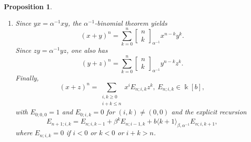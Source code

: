 \documentclass{amsart}
\newtheorem{proposition}[theorem]{Proposition}
\theoremstyle{definition}
\theoremstyle{remark}
\numberwithin{equation}{section}
\begin{document}
\begin{proposition}
\begin{enumerate}
\item[\rm (5)] Since $yx=\alpha^{-1}xy$, the $\alpha^{-1}$-binomial theorem yields
\[
(x+y)^n=\sum_{k=0}^{n}\begin{bmatrix} n\\ k\end{bmatrix}_{\alpha^{-1}}x^{n-k}y^{k}.
\]
Since $zy = \alpha^{-1}yz$, one also has
\[
(y+z)^n=\sum_{k=0}^{n}\begin{bmatrix} n\\ k\end{bmatrix}_{\alpha^{-1}}y^{n-k}z^{k}.
\]
Finally, 
\begin{equation}\label{Edefcase3ii}
(x+z)^n=\sum_{\substack{i,k\ge 0\\ i+k\le n}} x^{i}E_{n;i,k}z^{k},
\ E_{n;i,k}\in\Bbbk[b],
\end{equation}
with $E_{0;0,0}=1$ and $E_{0;i,k}=0$ for $(i,k)\neq(0,0)$ and the explicit recursion
\begin{equation}\label{Ereccase3ii}
E_{n+1;i,k}=E_{n;i,k-1}+\beta^{k}E_{n;i-1,k}+b\langle k+1\rangle_{\beta,\alpha^{-1}}E_{n;i,k+1},
\end{equation}
where $E_{n;i,k}=0$ if $i<0$ or $k<0$ or $i+k>n$.
\end{enumerate}
\end{proposition}
\end{document}
